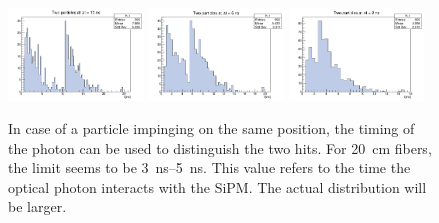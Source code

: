 \begin{refsection}
        \begin{figure}
            \centering
            \includegraphics[width=0.32\textwidth]{Figures/muEDM/Tracker/10ns.png}
            \includegraphics[width=0.32\textwidth]{Figures/muEDM/Tracker/5ns.png}
            \includegraphics[width=0.32\textwidth]{Figures/muEDM/Tracker/2ns.png}
            \caption{In case of a particle impinging on the same position, the timing of the photon can be used to distinguish the two hits. For \SI{20}{cm} fibers, the limit seems to be \SIrange{3}{5}{ns}. This value refers to the time the optical photon interacts with the SiPM. The actual distribution will be larger.}
            \label{fig:geant4_time}
        \end{figure}


\end{refsection}
